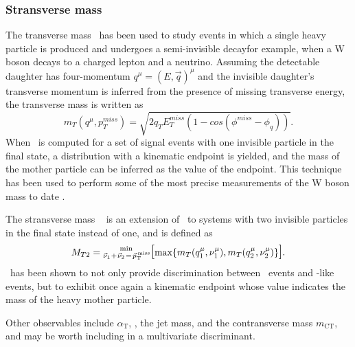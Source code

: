 \subsubsection{Stransverse mass \MTTwo}
The transverse mass \mt~has been used to study events in which a single heavy particle is produced and undergoes a semi-invisible decay\textemdash for example, when a W boson decays to a charged lepton and a neutrino.  Assuming the detectable daughter has four-momentum $q^\mu=(E, \vec{q})^\mu$ and the invisible daughter's transverse momentum is inferred from the presence of missing transverse energy, the transverse mass is written as
\begin{equation}
m_{T}(q^\mu,p_T^{miss})=\sqrt{2q_{T}E_{T}^{miss}(1-cos(\phi^{miss}-\phi_{q}))}.
\end{equation}
When \mt~is computed for a set of signal events with one invisible particle in the final state, a distribution with a kinematic endpoint is yielded, and the mass of the mother particle can be inferred as the value of the endpoint. This technique has been used to perform some of the most precise measurements of the W boson mass to date \cite{Abbott:1997ww}.

The stransverse mass \MTTwo~\cite{Lester:1999tx} is an extension of \mt~to systems with two invisible particles in the final state instead of one, and is defined as 
\begin{equation}
M_{T2}=\substack{\text{\normalsize{min}}\\\text{\normalsize{$\vec{\nu}_1\!+\!\vec{\nu}_2\!=\!\METvec$}}}\,\text{\Large{[}}\text{max}\{m_T(q_1^\mu,\nu_1^\mu),m_T(q_2^{\mu},\nu_2^\mu)\}\text{\Large{]}}.
\end{equation}
\MTTwo~has been shown \cite{Khachatryan:2015vra} to not only provide discrimination between \SM~events and \SUSY-like events, but to exhibit once again a kinematic endpoint whose value indicates the mass of the heavy mother particle. 

Other observables include $\alpha_{\text{T}}$,  \cite{Randall:2008rw}, the jet mass, and the contransverse mass $m_{\text{CT}}$, and may be worth including in a multivariate discriminant.
